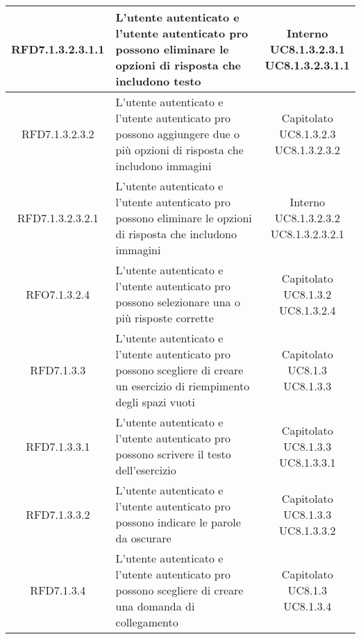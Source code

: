 \begin{longtable}{|c|>{\centering}m{7cm}|c|}
			 \hypertarget{{RFD7.1.3.2.3.1.1}}{{RFD7.1.3.2.3.1.1}} & L’utente autenticato e l'utente autenticato pro possono eliminare le opzioni di risposta che includono testo & \makecell{Interno\\ UC8.1.3.2.3.1 \\UC8.1.3.2.3.1.1 } \\ \hline
			 \hypertarget{{RFD7.1.3.2.3.2}}{{RFD7.1.3.2.3.2}} & L’utente autenticato e l'utente autenticato pro possono aggiungere due o più opzioni di risposta che includono immagini & \makecell{Capitolato\\ UC8.1.3.2.3 \\UC8.1.3.2.3.2 } \\ \hline
			 \hypertarget{{RFD7.1.3.2.3.2.1}}{{RFD7.1.3.2.3.2.1}} & L’utente autenticato e l'utente autenticato pro possono eliminare le opzioni di risposta che includono immagini  & \makecell{Interno\\ UC8.1.3.2.3.2 \\UC8.1.3.2.3.2.1 } \\ \hline
			 \hypertarget{{RFO7.1.3.2.4}}{{RFO7.1.3.2.4}} & L’utente autenticato e l'utente autenticato pro possono selezionare una o più risposte corrette & \makecell{Capitolato\\ UC8.1.3.2 \\UC8.1.3.2.4 } \\ \hline
			 \hypertarget{{RFD7.1.3.3}}{{RFD7.1.3.3}} & L’utente autenticato e l’utente autenticato pro possono scegliere di creare un esercizio di riempimento degli spazi vuoti  & \makecell{Capitolato\\ UC8.1.3 \\UC8.1.3.3 } \\ \hline
			 \hypertarget{{RFD7.1.3.3.1}}{{RFD7.1.3.3.1}} & L’utente autenticato e l'utente autenticato pro possono scrivere il testo dell’esercizio & \makecell{Capitolato\\ UC8.1.3.3 \\UC8.1.3.3.1 } \\ \hline
			 \hypertarget{{RFD7.1.3.3.2}}{{RFD7.1.3.3.2}} & L’utente autenticato e l'utente autenticato pro possono indicare le parole da oscurare & \makecell{Capitolato\\ UC8.1.3.3 \\UC8.1.3.3.2 } \\ \hline
			 \hypertarget{{RFD7.1.3.4}}{{RFD7.1.3.4}} & L’utente autenticato e l’utente autenticato pro possono scegliere di creare una domanda di collegamento & \makecell{Capitolato\\ UC8.1.3 \\UC8.1.3.4 } \\ \hline

\end{longtable}
